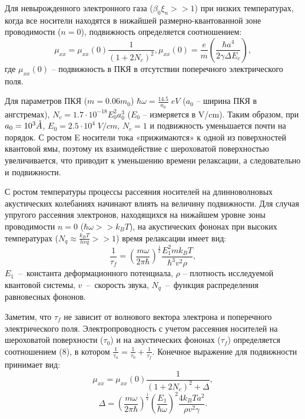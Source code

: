 Для невырожденного электронного газа ($\beta _{0} \xi _{n} >>1$) при низких температурах, когда все носители находятся в нижайшей размерно-квантованной зоне проводимости ($n=0$), подвижность определяется соотношением:
\begin{equation} \label{eq:41_90}
\mu _{xx} =\mu _{xx} (0)\frac{1}{\left(1+2N_{c} \right)^{2} } , \mu _{xx} (0)=\frac{e}{m} \left(\frac{\hbar a^{4} }{2\gamma \Delta E_{c} } \right),
\end{equation} 
где $\mu _{xx} (0)$ -- подвижность в ПКЯ в отсутствии поперечного электрического поля.

Для параметров ПКЯ ($m=0.06m_{0} $) $\hbar \omega =\frac{14.5}{a_{0} } {\mathrm \; eV}$ ($a_{0} $ -- ширина ПКЯ в ангстремах), $N_{c} =1.7\cdot 10^{-18} E_{0}^{2} a_{0}^{3} $ ($E_{0} $ -- измеряется в V/cm). Таким образом, при $a_{0} =10^{3} \AA$, $E_{0} =2.5\cdot 10^{4} {\mathrm \; V/cm}$, $N_{c} =1$ и подвижность уменьшается почти на порядок. С ростом E носители тока «прижимаются» к одной из поверхностей квантовой ямы, поэтому их взаимодействие с шероховатой поверхностью увеличивается, что приводит к уменьшению времени релаксации, а следовательно и подвижности.

С ростом температуры процессы рассеяния носителей на длинноволновых акустических колебаниях начинают влиять на величину подвижности. Для случая упругого рассеяния электронов, находящихся на нижайшем уровне зоны проводимости $n=0$ ($\hbar \omega >>k_{B} T$), на акустических фононах при высоких температурах ($N_{q} \approx \frac{k_{B} T}{hvq} >>1$) время релаксации имеет вид:
\begin{equation} \label{eq:41_100}
\frac{1}{\tau _{f} } =\left(\frac{m\omega }{2\pi \hbar } \right)^{\frac{1}{2} } \frac{E_{1}^{2} mk_{B} T}{\hbar ^{3} v^{2} \rho } , 
\end{equation} 
$E_{1} $~--~константа деформационного потенциала, $\rho $ -- плотность исследуемой квантовой системы, $v$~--~скорость звука, $N_{q} $~--~функция распределения равновесных фононов.

Заметим, что $\tau _{f} $ не зависит от волнового вектора электрона и поперечного электрического поля. Электропроводность с учетом рассеяния носителей на шероховатой поверхности ($\tau _{0} $) и на акустических фононах ($\tau _{f} $) определяется соотношением (8), в котором $\frac{1}{\tau _{n} } =\frac{1}{\tau _{0} } +\frac{1}{\tau _{f} } $. Конечное выражение для подвижности принимает вид:
\begin{equation} \label{eq:41_110}
\mu _{xx} =\mu _{xx} (0)\frac{1}{\left(1+2N_{c} \right)^{2} +\Delta } , 
\end{equation} 
\[
\Delta =\left(\frac{m\omega }{2\pi \hbar } \right)^{\frac{1}{2} } \left(\frac{E_{1} }{\hbar \omega } \right)^{2} \frac{4k_{B} Ta^{2} }{\rho v^{2} \gamma }. 
\] 

